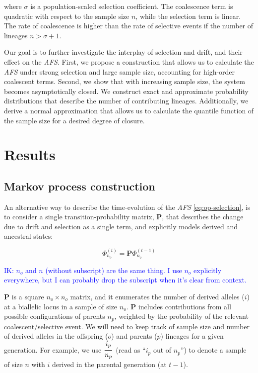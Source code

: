 \documentclass[review]{elsarticle}
\newcommand{\afs}[2]{\Phi_{#1}^{(#2)}}
\newcommand{\Dfrac}[2]{%
  \ooalign{%
    $\genfrac{}{}{1.2pt}0{#1}{#2}$\cr%
    $\color{white}\genfrac{}{}{.4pt}0{\phantom{#1}}{\phantom{#2}}$}%
}
\newcommand{\ikcomment}[1]{\textcolor{blue}{IK: #1}}
\begin{document}
where $\sigma$ is a population-scaled selection coefficient. The coalescence term is quadratic with
respect to the sample size $n$, while the selection term is linear. The rate of coalescence is
higher than the rate of selective events if the number of lineages $n>\sigma+1$.

Our goal is to further investigate the interplay of selection and drift, and their effect on the
\textit{AFS}. First, we propose a construction that allows us to calculate the \textit{AFS} under
strong selection and large sample size, accounting for high-order coalescent terms. Second, we show
that with increasing sample size, the system becomes asymptotically closed. We construct exact and
approximate probability distributions that describe the number of contributing lineages.
Additionally, we derive a normal approximation that allows us to calculate the quantile function of
the sample size for a desired degree of closure.


\section{Results}
\label{sec:results}

\subsection{Markov process construction}
\label{subsec:markov}

An alternative way to describe the time-evolution of the \textit{AFS} \eqref{eq:op-selection}, is to
consider a single transition-probability matrix, $\mathbf{P}$, that describes the change due to
drift and selection as a single term, and explicitly models derived and ancestral states:

\begin{equation}
  \label{eq:app:time-evolution}
  \afs{n_o}{t} = \mathbf{P} \afs{n_o}{t-1}
\end{equation}


\ikcomment{$n_o$ and $n$ (without subscript) are the same thing. I use $n_o$ explicitly everywhere,
  but I can probably drop the subscript when it's clear from context.}

$\mathbf{P}$ is a square $n_o \times n_o$ matrix, and it enumerates the number of derived alleles
($i$) at a biallelic locus in a sample of size $n_o$. $\mathbf{P}$ includes contributions from
all possible configurations of parents $n_p$, weighted by the probability of the relevant
coalescent/selective event. We will need to keep track of sample size and number of derived alleles
in the offspring ($o$) and parents ($p$) lineages for a given generation. For example, we use
$\Dfrac{i_p}{n_p}$ (read as ``$i_p$ out of $n_p$'') to denote a sample of size $n$ with $i$ derived in
the parental generation (at $t-1$).
\end{document}

